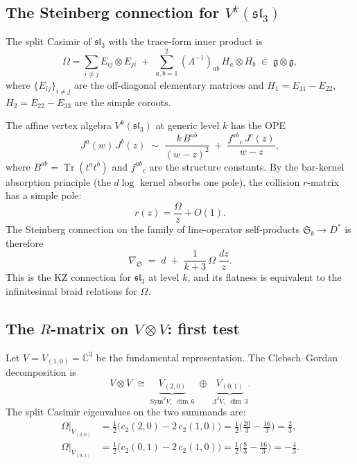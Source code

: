 \documentclass[11pt]{article}
\newcommand{\fg}{\mathfrak{g}}
\newcommand{\fsl}{\mathfrak{sl}}
\newcommand{\C}{\mathbb{C}}
\newcommand{\Tr}{\operatorname{Tr}}
\begin{document}
\subsection{The Steinberg connection for $V^k(\fsl_3)$}
\label{subsec:sl3-steinberg}

The split Casimir of $\fsl_3$ with the trace-form inner product is
\[
  \Omega = \sum_{i \neq j} E_{ij} \otimes E_{ji}
  \;+\; \sum_{a,b=1}^{2} (A^{-1})_{ab}\, H_a \otimes H_b
  \;\in\; \fg \otimes \fg,
\]
where $\{E_{ij}\}_{i\neq j}$ are the off-diagonal elementary matrices
and $H_1 = E_{11} - E_{22}$, $H_2 = E_{22} - E_{33}$ are the
simple coroots.

The affine vertex algebra $V^k(\fsl_3)$ at generic level $k$ has
the OPE
\[
  J^a(w)\, J^b(z)
  \;\sim\;
  \frac{k\, B^{ab}}{(w-z)^2}
  \;+\;
  \frac{f^{ab}{}_c\, J^c(z)}{w-z},
\]
where $B^{ab} = \Tr(t^a t^b)$ and $f^{ab}{}_c$ are the structure
constants.  By the bar-kernel absorption principle
(the $d\log$ kernel absorbs one pole), the collision
$r$-matrix has a simple pole:
\[
  r(z) = \frac{\Omega}{z} + O(1).
\]
The Steinberg connection on the family of line-operator
self-products $\mathfrak{S}_b \to D^*$ is therefore
\begin{equation}\label{eq:sl3-steinberg}
  \nabla_{\mathfrak{S}}
  \;=\; d \;+\; \frac{1}{k+3}\,\Omega\;\frac{dz}{z}.
\end{equation}
This is the KZ connection for $\fsl_3$ at level $k$, and its
flatness is equivalent to the infinitesimal braid relations
for $\Omega$.


\subsection{The $R$-matrix on $V \otimes V$: first test}
\label{subsec:sl3-VxV}

Let $V = V_{(1,0)} = \C^3$ be the fundamental representation.
The Clebsch--Gordan decomposition is
\[
  V \otimes V
  \;\cong\;
  \underbrace{V_{(2,0)}}_{\mathrm{Sym}^2 V,\;\dim\, 6}
  \;\oplus\;
  \underbrace{V_{(0,1)}}_{\Lambda^2 V,\;\dim\, 3}.
\]
The split Casimir eigenvalues on the two summands are:
\begin{align*}
  \Omega\big|_{V_{(2,0)}}
  &= \tfrac{1}{2}\bigl(c_2(2,0) - 2\,c_2(1,0)\bigr)
   = \tfrac{1}{2}\bigl(\tfrac{20}{3} - \tfrac{16}{3}\bigr)
   = \tfrac{2}{3},\\[4pt]
  \Omega\big|_{V_{(0,1)}}
  &= \tfrac{1}{2}\bigl(c_2(0,1) - 2\,c_2(1,0)\bigr)
   = \tfrac{1}{2}\bigl(\tfrac{8}{3} - \tfrac{16}{3}\bigr)
   = -\tfrac{4}{3}.
\end{align*}
\end{document}
